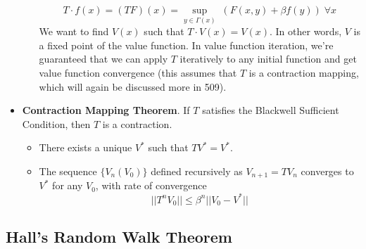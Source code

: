 \documentclass[12pt]{article}
\begin{document}
\begin{itemize}
\begin{enumerate}
        \[T\cdot f(x) = (TF)(x) = \sup_{y\in \Gamma(x)}\; (F(x,y) + \beta f(y)) \; \forall x\]
        We want to find $V(x)$ such that $T\cdot V(x) = V(x)$. In other words, $V$ is a fixed point of the value function. In value function iteration, we're guaranteed that we can apply $T$ iteratively to any initial function and get value function convergence (this assumes that $T$ is a contraction mapping, which will again be discussed more in 509). 
    \end{enumerate}
    \item \textbf{Contraction Mapping Theorem}. If $T$ satisfies the Blackwell Sufficient Condition, then $T$ is a contraction. 
    \begin{itemize}
        \item There exists a unique $V^*$ such that $TV^* = V^*$. 
        \item The sequence $\{V_n(V_0)\}$ defined recursively as $V_{n+1} = TV_n$ converges to $V^*$ for any $V_0$, with rate of convergence \[||T^nV_0|| \leq \beta^n||V_0 - V^*||\]
    \end{itemize}
\end{itemize}

\subsection{Hall's Random Walk Theorem}
\end{document}

